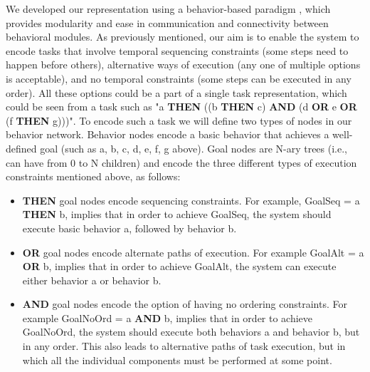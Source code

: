 \documentclass[letterpaper, 10 pt, conference]{ieeeconf}  %
\begin{document}
We developed our representation using a behavior-based paradigm \cite{arkin1998behavior}, which provides modularity and ease in communication and connectivity between behavioral modules.  As previously mentioned, our aim is to enable the system to encode tasks that involve temporal sequencing constraints (some steps need to happen before others), alternative ways of execution (any one of multiple options is acceptable), and no temporal constraints (some steps can be executed in any order). All these options could be a part of a single task representation, which could be seen from a task such as "a {\bf THEN} ((b {\bf THEN} c) {\bf AND} (d {\bf OR} e {\bf OR} (f {\bf THEN} g)))". To encode such a task we will define two types of nodes in our behavior network. Behavior nodes encode a basic behavior that achieves a well-defined goal (such as a, b, c, d, e, f, g above). Goal nodes are N-ary trees (i.e., can have from 0 to N children) and encode the three different types of execution constraints mentioned above, as follows:
\begin{itemize}

\item {\bf THEN} goal nodes encode sequencing constraints. For example, GoalSeq = a {\bf THEN} b, implies that in order to achieve GoalSeq, the system should execute basic behavior a, followed by behavior b.

\item {\bf OR} goal nodes encode alternate paths of execution. For example GoalAlt = a {\bf OR} b, implies that in order to achieve GoalAlt, the system can execute either behavior a or behavior b.

\item {\bf AND} goal nodes encode the option of having no ordering constraints. For example GoalNoOrd = a {\bf AND} b, implies that in order to achieve GoalNoOrd, the system should execute both behaviors a and behavior b, but in any order. This also leads to alternative paths of task execution, but in which all the individual components must be performed at some point.

\end{itemize}
\end{document}
